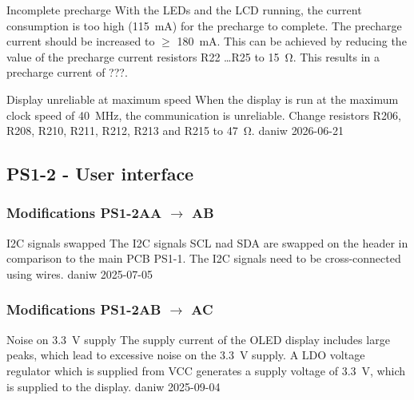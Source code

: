 \begin{ModTable}
\ModItemOpen
{Incomplete precharge}
{With the LEDs and the LCD running, the current consumption is too high (\qty{115}{\milli\ampere}) for the precharge to complete. }
{The precharge current should be increased to $\geq$ \qty{180}{\milli\ampere}. This can be achieved by reducing the value of the precharge current resistors R22 \ldots R25 to \qty{15}{\ohm}. This results in a precharge current of ???. }
{}
{}

\ModItemDone
{Display unreliable at maximum speed}
{When the display is run at the maximum clock speed of \qty{40}{\mega\hertz}, the communication is unreliable. }
{Change resistors R206, R208, R210, R211, R212, R213 and R215 to \qty{47}{\ohm}. }
{daniw}
{2026-06-21}

\end{ModTable}

\FloatBarrier

\subsection{PS1-2 - User interface}

\subsubsection{Modifications PS1-2AA $\to$ AB}

\begin{ModTable}

\ModItemDone
{\acs{I2C} signals swapped}
{The \ac{I2C} signals SCL nad SDA are swapped on the header in comparison to the main PCB PS1-1. }
{The \ac{I2C} signals need to be cross-connected using wires. }
{daniw}
{2025-07-05}

\end{ModTable}

\FloatBarrier

\subsubsection{Modifications PS1-2AB $\to$ AC}

\begin{ModTable}

\ModItemDone
{Noise on \qty{3.3}{\volt} supply}
{The supply current of the \ac{OLED} display includes large peaks, which lead to excessive noise on the \qty{3.3}{\volt} supply. }
{A \ac{LDO} voltage regulator which is supplied from VCC generates a supply voltage of \qty{3.3}{\volt}, which is supplied to the display. }
{daniw}
{2025-09-04}

\end{ModTable}

